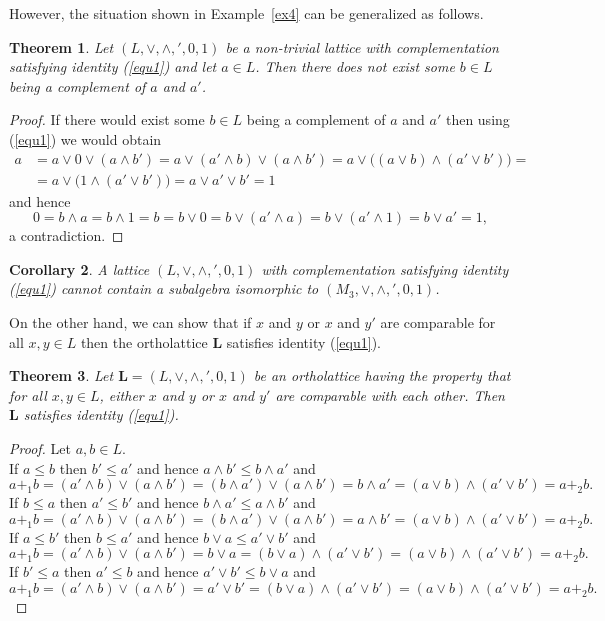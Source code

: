 \documentclass[12pt]{article}
\newtheorem{theorem}{Theorem}[section]
\newtheorem{corollary}[theorem]{Corollary}
\begin{document}
However, the situation shown in Example~\ref{ex4} can be generalized as follows.

\begin{theorem}
Let $(L,\vee,\wedge,{}',0,1)$ be a non-trivial lattice with complementation satisfying identity {\rm(\ref{equ1})} and let $a\in L$. Then there does not exist some $b\in L$ being a complement of $a$ and $a'$.
\end{theorem}

\begin{proof}
If there would exist some $b\in L$ being a complement of $a$ and $a'$ then using (\ref{equ1}) we would obtain
\begin{align*}
a & =a\vee0\vee(a\wedge b')=a\vee(a'\wedge b)\vee(a\wedge b')=a\vee\big((a\vee b)\wedge(a'\vee b')\big)= \\
  & =a\vee\big(1\wedge(a'\vee b')\big)=a\vee a'\vee b'=1
\end{align*}
and hence
\[
0=b\wedge a=b\wedge1=b=b\vee0=b\vee(a'\wedge a)=b\vee(a'\wedge1)=b\vee a'=1,
\]
a contradiction.
\end{proof}

\begin{corollary}\label{cor1}
A lattice $(L,\vee,\wedge,{}',0,1)$ with complementation satisfying identity {\rm(\ref{equ1})} cannot contain a subalgebra isomorphic to $(M_3,\vee,\wedge,{}',0,1)$.
\end{corollary}
\label{key}
On the other hand, we can show that if $x$ and $y$ or $x$ and $y'$ are comparable for all $x,y\in L$ then the ortholattice $\mathbf L$ satisfies identity (\ref{equ1}).

\begin{theorem}\label{th1}
Let $\mathbf L=(L,\vee,\wedge,{}',0,1)$ be an ortholattice having the property that for all $x,y\in L$, either $x$ and $y$ or $x$ and $y'$ are comparable with each other. Then $\mathbf L$ satisfies identity {\rm(\ref{equ1})}.
\end{theorem}

\begin{proof}
Let $a,b\in L$. \\
If $a\le b$ then $b'\le a'$ and hence $a\wedge b'\le b\wedge a'$ and
\[
a+_1b=(a'\wedge b)\vee(a\wedge b')=(b\wedge a')\vee(a\wedge b')=b\wedge a'=(a\vee b)\wedge(a'\vee b')=a+_2b.
\]
If $b\le a$ then $a'\le b'$ and hence $b\wedge a'\le a\wedge b'$ and
\[
a+_1b=(a'\wedge b)\vee(a\wedge b')=(b\wedge a')\vee(a\wedge b')=a\wedge b'=(a\vee b)\wedge(a'\vee b')=a+_2b.
\]
If $a\le b'$ then $b\le a'$ and hence $b\vee a\le a'\vee b'$ and
\[
a+_1b=(a'\wedge b)\vee(a\wedge b')=b\vee a=(b\vee a)\wedge(a'\vee b')=(a\vee b)\wedge(a'\vee b')=a+_2b.
\]
If $b'\le a$ then $a'\le b$ and hence $a'\vee b'\le b\vee a$ and
\[
a+_1b=(a'\wedge b)\vee(a\wedge b')=a'\vee b'=(b\vee a)\wedge(a'\vee b')=(a\vee b)\wedge(a'\vee b')=a+_2b.
\]
\end{proof}
\end{document}
